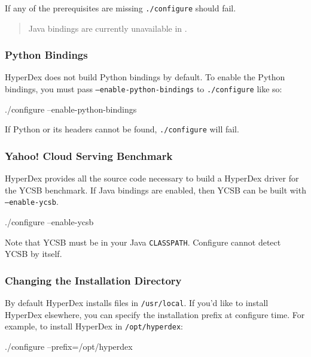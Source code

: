 If any of the prerequisites are missing \texttt{./configure} should fail.

\begin{quote}
Java bindings are currently unavailable in \HyperDexVersion.
\end{quote}

\subsubsection{Python Bindings}
\label{sec:installation:source:python}

HyperDex does not build Python bindings by default.  To enable the Python
bindings, you must pass \texttt{--enable-python-bindings} to
\texttt{./configure} like so:

\begin{consolecode}
./configure --enable-python-bindings
\end{consolecode}

If Python or its headers cannot be found, \texttt{./configure} will fail.

\subsubsection{Yahoo! Cloud Serving Benchmark}
\label{sec:installation:source:ycsb}

HyperDex provides all the source code necessary to build a HyperDex driver
for the YCSB benchmark.  If Java bindings are enabled, then YCSB can be built
with \texttt{--enable-ycsb}.

\begin{consolecode}
./configure --enable-ycsb
\end{consolecode}

Note that YCSB must be in your Java \texttt{CLASSPATH}.  Configure cannot detect
YCSB by itself.

\subsubsection{Changing the Installation Directory}
\label{sec:installation:source:prefix}

By default HyperDex installs files in \texttt{/usr/local}.  If you'd like to
install HyperDex elsewhere, you can specify the installation prefix at configure
time.  For example, to install HyperDex in \texttt{/opt/hyperdex}:

\begin{consolecode}
./configure --prefix=/opt/hyperdex
\end{consolecode}

